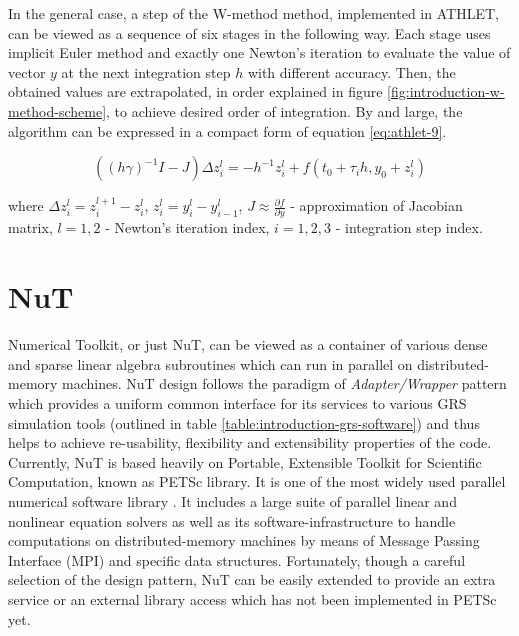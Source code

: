 In the general case, a step of the W-method method, implemented in ATHLET, can be viewed as a sequence of six stages in the following way. Each stage uses implicit Euler method and exactly one Newton's iteration to evaluate the value of vector $y$ at the next integration step $h$ with different accuracy. Then, the obtained values are extrapolated, in order explained in figure \ref{fig:introduction-w-method-scheme}, to achieve desired order of integration. By and large, the algorithm can be expressed in a compact form of equation \ref{eq:athlet-9}.

\begin{equation} \label{eq:athlet-9}
	((h \gamma)^{-1}I - J) \Delta z^{l}_{i} = - h^{-1} z^{l}_{i} + f(t_0 + \tau_{i} h, y_{0} + z^{l}_{i})
\end{equation}

where $\Delta z^{l}_{i} = z^{l+1}_{i} - z^{l}_{i}$, $z^{l}_{i} = y^{l}_{i} - y^{l}_{i - 1}$, $J \approx \frac{\partial f}{\partial y}$ - approximation of Jacobian matrix, $l = 1,2$ - Newton's iteration index, $i = 1, 2, 3$ - integration step index.\\


\section{NuT}

Numerical Toolkit, or just NuT, can be viewed as a container of various dense and sparse linear algebra subroutines which can run in parallel on distributed-memory machines. NuT design follows the paradigm of \textit{Adapter/Wrapper} pattern which provides a uniform common interface for its services to various GRS simulation tools (outlined in table \ref{table:introduction-grs-software}) and thus helps to achieve re-usability, flexibility and extensibility properties of the code.\\


Currently, NuT is based heavily on Portable, Extensible Toolkit for Scientific Computation, known as PETSc library. It is one of the most widely used parallel numerical software  library \cite{wiki:petsc-general-info}. It includes a large suite of parallel linear and nonlinear equation solvers as well as its software-infrastructure to handle computations on distributed-memory machines by means of Message Passing Interface (MPI) and specific data structures. Fortunately, though a careful selection of the design pattern, NuT can be easily extended to provide an extra service or an external library access which has not been implemented in PETSc yet.\\ 


